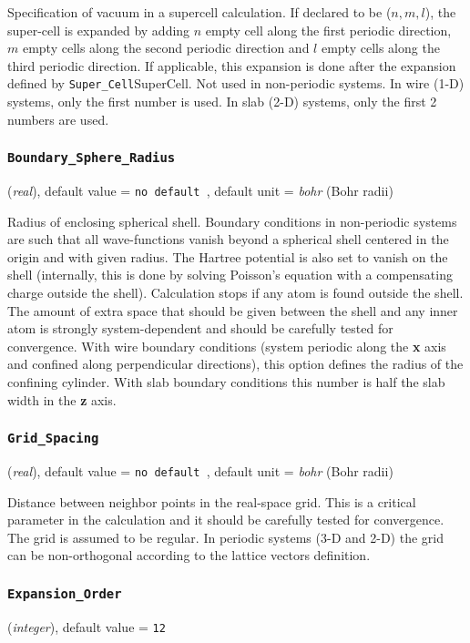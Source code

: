 \documentclass{article}
\begin{document}
Specification of vacuum in a supercell calculation. If declared to be
($n,m,l$), the super-cell is expanded by adding $n$ empty cell along the
first periodic direction, $m$ empty cells along the second periodic
direction and $l$ empty cells along the third periodic direction. If
applicable, this expansion is done after the expansion defined by
{\tt Super\_Cell}{SuperCell}. Not used in non-periodic
systems. In wire (1-D) systems, only the first number is used. In slab 
(2-D) systems, only the first 2 numbers are used.

\subsubsection{\tt Boundary\_Sphere\_Radius 
\label{BoundarySphereRadius}}
({\it real}),
default value = {\tt no default },
default unit = {\it bohr} (Bohr radii)

Radius of enclosing spherical shell. Boundary conditions in
non-periodic systems are such that all wave-functions vanish beyond a spherical
shell centered in the origin and with given radius. The Hartree potential is
also set to vanish on the shell (internally, this is done by solving Poisson's
equation with a compensating charge outside the shell). Calculation stops if any
atom is found outside the shell. The amount of extra space that should be given
between the shell and any inner atom is strongly system-dependent and should be
carefully tested for convergence. With wire boundary conditions
(system periodic along the {\bf x} axis and confined along
perpendicular directions), this option defines the radius of the
confining cylinder. With slab boundary conditions this number is half the slab
width in the {\bf z} axis.

\subsubsection{\tt Grid\_Spacing 
\label{GridSpacing}}
({\it real}),
default value = {\tt no default },
default unit = {\it bohr} (Bohr radii)

Distance between neighbor points in the real-space grid.
This is a critical parameter in the calculation and it should be carefully
tested for convergence. The grid is assumed to be regular. In periodic systems 
(3-D and 2-D) the grid can be non-orthogonal according to the lattice vectors
definition.

\subsubsection{\tt Expansion\_Order 
\label{ExpansionOrder}}
({\it integer}),
default value = {\tt 12 }
\end{document}
